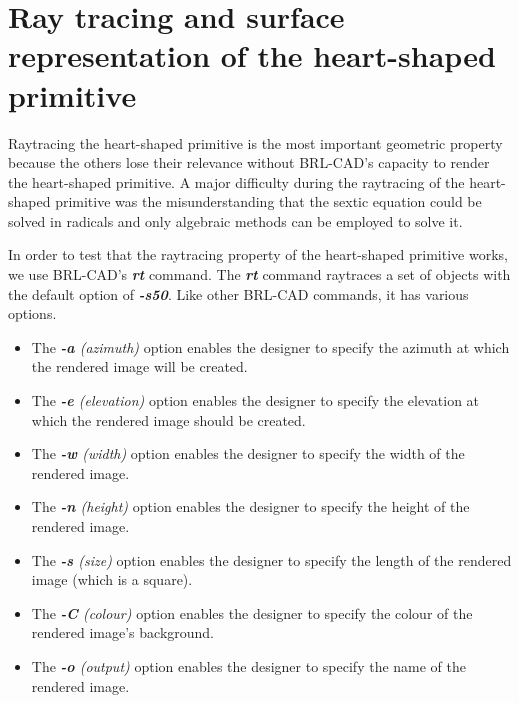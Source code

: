 

\section{Ray tracing and surface representation of the heart-­shaped primitive}

\hspace{30} Ray­tracing   the   heart­-shaped   primitive   is   the   most   important   geometric  
property   because   the   others   lose their relevance without   BRL­-CAD's   capacity   to   render  
the   heart­-shaped   primitive.   A   major   difficulty   during   the   raytracing   of   the  
heart­-shaped   primitive   was   the   misunderstanding   that   the   sextic   equation   could  
be solved in radicals and only algebraic methods can be employed to solve it.  

\hspace{30} In   order   to   test   that   the   ray­tracing   property   of   the   heart­-shaped   primitive  
works, we use BRL-­CAD's \textit{\textbf{rt}} \cite{41} command. The \textit{\textbf{rt}} command ray­traces a set
 of objects with the default option of \textit{\textbf{-­s50}}. Like other BRL­-CAD commands, it has various options.

\begin{itemize}
\item The \textit{\textbf{-a} (azimuth)} option enables the designer to specify the azimuth at which the rendered image will be created.  
\item The \textit{\textbf{-­e} (elevation)} option enables the designer to specify the elevation at which the rendered image should be created.  
\item The \textit{\textbf{-w} (width)} option enables the designer to specify the width of the rendered image.  
\item The \textit{\textbf{-­n} (height)} option enables the designer to specify the height of the rendered image.  
\item The \textit{\textbf{-­s} (size)} option enables the designer to specify the length of the rendered image (which is a square).  
\item The \textit{\textbf{-­C} (colour)} option enables the designer to specify the colour of the rendered image's background.  
\item The \textit{\textbf{-­o} (output)} option enables the designer to specify the name of the rendered image.
\end{itemize}

